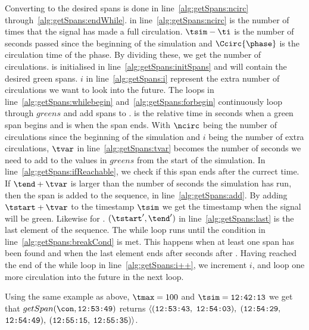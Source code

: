 Converting \greens to the desired spans is done in line~\ref{alg:getSpans:ncirc} through~\ref{alg:getSpans:endWhile}.
\ncirc in line~\ref{alg:getSpans:ncirc} is the number of times that the signal has made a full circulation.
$\tsim-\ti$ is the number of seconds passed since the beginning of the simulation and $\Ccirc{\phase}$ is the circulation time of the phase. 
By dividing these, we get the number of circulations.
\spans is initialised in line~\ref{alg:getSpans:initSpans} and will contain the desired green spans.
$i$ in line~\ref{alg:getSpans:i} represent the extra number of circulations we want to look into the future.
The loops in line~\ref{alg:getSpans:whilebegin} and~\ref{alg:getSpans:forbegin} continuously loop through $greens$ and add spans to \spans.
\tstart is the relative time in seconds when a green span begins and \tend is when the span ends.
With $\ncirc$ being the number of circulations since the beginning of the simulation and $i$ being the number of extra circulations, $\tvar$ in line~\ref{alg:getSpans:tvar} becomes the number of seconds we need to add to the values in $greens$ from the start of the simulation.
In line~\ref{alg:getSpans:ifReachable}, we check if this span ends after the currect time.
If $\tend + \tvar$ is larger than the number of seconds the simulation has run, then the span is added to the sequence, \spans in line~\ref{alg:getSpans:add}.
By adding $\tstart + \tvar$ to the timestamp $\tsim$ we get the timestamp when the signal will be green. Likewise for \tend.
$(\tstart', \tend')$ in line~\ref{alg:getSpans:last} is the last element of the sequence.
The while loop runs until the condition in line~\ref{alg:getSpans:breakCond} is met.
This happens when at least one span has been found and when the last element ends after \tmax seconds after \ti.
Having reached the end of the while loop in line~\ref{alg:getSpans:i++}, we increment $i$, and loop one more circulation into the future in the next loop.

Using the same example as above, $\tmax=100$ and $\tsim=\verb#12:42:13#$ we get that $getSpan(\con, \verb#12:53:49#)$ returns $\langle(\verb#12:53:43#,$ $\verb#12:54:03#),$ $(\verb#12:54:29#,$ $\verb#12:54:49#),$ $(\verb#12:55:15#,$ $\verb#12:55:35#)\rangle$.

